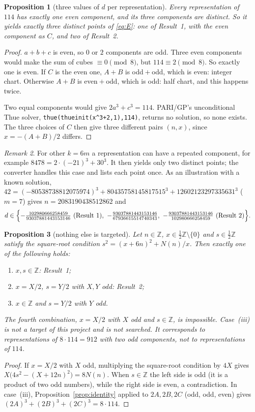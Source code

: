 \documentclass[11pt,a4paper]{article}
\newtheorem{proposition}{Proposition}
\theoremstyle{remark}
\newtheorem{remark}[proposition]{Remark}
\begin{document}
\begin{proposition}[three values of $d$ per representation]\label{prop:three}
Every representation of $114$ has exactly one even component, and its three components are
distinct. So it yields exactly three distinct points of \eqref{eq:E}: one of Result~1, with
the even component as $C$, and two of Result~2.
\end{proposition}
\begin{proof}
$a+b+c$ is even, so $0$ or $2$ components are odd. Three even components would make the sum
of cubes $\equiv0\pmod8$, but $114\equiv2\pmod8$. So exactly one is even. If $C$ is the even
one, $A+B$ is odd${}+{}$odd, which is even: integer chart. Otherwise $A+B$ is
even${}+{}$odd, which is odd: half chart, and this happens twice.

Two equal components would give $2a^3+c^3=114$. PARI/GP's unconditional Thue solver,
\texttt{thue(thueinit(x\^{}3+2,1),114)}, returns no solution, so none exists. The three
choices of $C$ then give three different pairs $(n,x)$, since $x=-(A+B)/2$ differs.
\end{proof}

\begin{remark}
For other $k=6m$ a representation can have a repeated component, for example
$8478=2\cdot(-21)^3+30^3$. It then yields only two distinct points; the converter handles
this case and lists each point once. As an illustration with a known solution,
$42=(-80538738812075974)^3+80435758145817515^3+12602123297335631^3$ ($m=7$) gives
$n=2083190438512862$ and
\[
d\in\Bigl\{-\tfrac{102980666258459}{93037881443153146}\ (\text{Result 1}),\
-\tfrac{93037881443153146}{67936615514740343},\
-\tfrac{93037881443153146}{102980666258459}\ (\text{Result 2})\Bigr\}.
\]
\end{remark}

\begin{proposition}[nothing else is targeted]\label{prop:only}
Let $n\in\mathbb Z$, $x\in\tfrac12\mathbb Z\setminus\{0\}$ and $s\in\tfrac12\mathbb Z$ satisfy
the square-root condition $s^2=(x+6n)^2+N(n)/x$. Then exactly one of the following holds:
\begin{enumerate}[label=(\roman*)]
  \item $x,s\in\mathbb Z$: Result~1;
  \item $x=X/2$, $s=Y/2$ with $X,Y$ odd: Result~2;
  \item $x\in\mathbb Z$ and $s=Y/2$ with $Y$ odd.
\end{enumerate}
The fourth combination, $x=X/2$ with $X$ odd and $s\in\mathbb Z$, is impossible. Case~(iii) is
not a target of this project and is not searched. It corresponds to representations of
$8\cdot114=912$ with two odd components, not to representations of $114$.
\end{proposition}
\begin{proof}
If $x=X/2$ with $X$ odd, multiplying the square-root condition by $4X$ gives
$X\bigl(4s^2-(X+12n)^2\bigr)=8N(n)$. When $s\in\mathbb Z$ the left side is odd (it is a
product of two odd numbers), while the right side is even, a contradiction. In case~(iii),
Proposition~\ref{prop:identity} applied to $2A,2B,2C$ (odd, odd, even) gives
$(2A)^3+(2B)^3+(2C)^3=8\cdot114$.
\end{proof}
\end{document}
